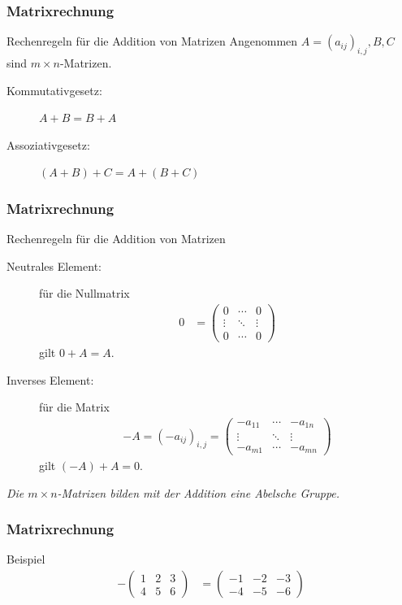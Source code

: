 \documentclass{beamer}
\renewcommand{\emph}[1]{{\textcolor{solarizedRed}{\itshape #1}}}
\newcommand{\ue}{\"u}
\newcommand{\mytitle}{Matrixrechnung}
\begin{document}
\begin{frame}\frametitle{\mytitle}
	\begin{block}{Rechenregeln f\ue r die Addition von Matrizen}
		Angenommen $A=(a_{ij})_{i,j},B,C$ sind $m\times n$-Matrizen.
		\begin{description}
			\item[Kommutativgesetz:] $A+B=B+A$
			\item[Assoziativgesetz:] $(A+B)+C=A+(B+C)$
		\end{description}
	\end{block}
\end{frame}

\begin{frame}\frametitle{\mytitle}
	\begin{block}{Rechenregeln f\ue r die Addition von Matrizen}
		\begin{description}
			\item[Neutrales Element:] f\ue r die Nullmatrix
						\begin{align*}
							0&=\begin{pmatrix}
								0&\cdots&0\\\vdots&\ddots&\vdots\\0&\cdots&0
							\end{pmatrix}
						\end{align*}
				gilt $0+A=A$.
			\item[Inverses Element:] f\ue r die Matrix \begin{align*}
					-A=(-a_{ij})_{i,j}=\begin{pmatrix}-a_{11}&\cdots&-a_{1n}\\\vdots&\ddots&\vdots\\-a_{m1}&\cdots&-a_{mn}\end{pmatrix}
			\end{align*} gilt $(-A)+A=0$.
		\end{description}
	\emph{Die $m\times n$-Matrizen bilden mit der Addition eine Abelsche Gruppe.}
	\end{block}
\end{frame}

\begin{frame}\frametitle{\mytitle}
	\begin{block}{Beispiel}
		\begin{align*}
			-\begin{pmatrix} 1&2&3\\4&5&6 \end{pmatrix}&=\begin{pmatrix} -1&-2&-3\\-4&-5&-6 \end{pmatrix}
		\end{align*}
	\end{block}
\end{frame}
\end{document}
